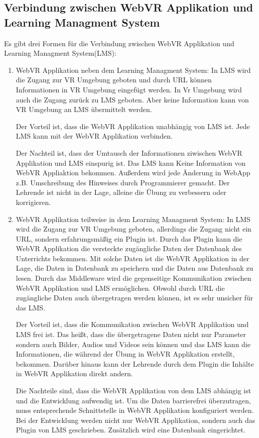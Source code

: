  \subsection{Verbindung zwischen WebVR Applikation und Learning Managment System}
 Es gibt drei Formen für die Verbindung zwischen WebVR Applikation und Learning Managment System(LMS):
 \begin{enumerate}
   \item WebVR Applikation neben dem Learning Managment System:
     \subitem In LMS wird die Zugang zur VR Umgebung geboten und durch URL können Informationen in VR Umgebung eingefügt werden. In Vr Umgebung wird auch die Zugang zurück zu LMS geboten. Aber keine Information kann von VR Umgebung an LMS übermittelt werden.
     
     Der Vorteil ist, dass die WebVR Applikation unabhängig von LMS ist. Jede LMS kann mit der WebVR Applikation verbinden.
     
     Der Nachteil ist, dass der Umtausch der Informationen ziwischen WebVR Applikation und LMS einspurig ist. Das LMS kann Keine Information von WebVR Appliaktion bekommen. Außerdem wird jede Änderung in WebApp z.B. Umschreibung des Hinweises durch Programmierer gemacht. Der Lehrende ist nicht in der Lage, alleine die Übung zu verbessern oder korrigieren.
     
   \item WebVR Applikation teilweise in dem Learning Managment System:
     \subitem In LMS wird die Zugang zur VR Umgebung geboten, allerdings die Zugang nicht ein URL, sondern erfahrungsmäßig ein Plugin ist. Durch das Plugin kann die WebVR Applikation die versteckte zugängliche Daten der Datenbank des Unterrichts bekommen. Mit solche Daten ist die WebVR Applikation in der Lage, die Daten in Datenbank zu speichern und die Daten aus Datenbank zu lesen. Durch das Middleware wird die gegenseitige Kommunikation zwischen WebVR Applikation und LMS ermöglichen. Obwohl durch URL die zugängliche Daten auch übergetragen werden können, ist es sehr unsicher für das LMS.
     
     Der Vorteil ist, dass die Kommunikation zwischen WebVR Applikation und LMS frei ist. Das heißt, dass die übergetragene Daten nicht nur Parameter sondern auch Bilder, Audios und Videos sein können und das LMS kann die Informationen, die während der Übung in WebVR Applikation erstellt, bekommen. Darüber hinaus kann der Lehrende durch dem Plugin die Inhälte in WebVR Applikation direkt andern.
     
     Die Nachteile sind, dass die WebVR Applikation von dem LMS abhängig ist und die Entwicklung aufwendig ist. Um die Daten barrierefrei überzutragen, muss entsprechende Schnittstelle in WebVR Applikation konfiguriert werden. Bei der Entwicklung werden nicht nur WebVR Applikation, sondern auch das Plugin von LMS geschrieben. Zusätzlich wird eine Datenbank eingerichtet.
     

\end{enumerate}
